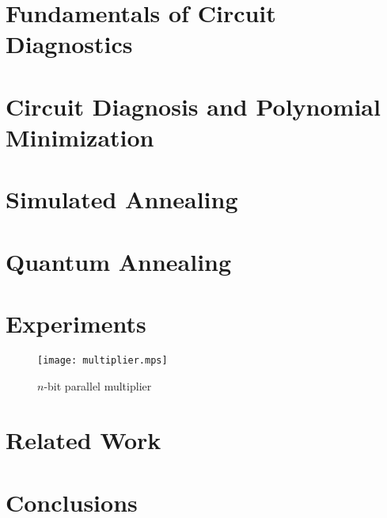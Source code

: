 \documentclass{article}
\begin{document}
\section{Fundamentals of Circuit Diagnostics}
\section{Circuit Diagnosis and Polynomial Minimization}
\section{Simulated Annealing}
\section{Quantum Annealing}
\section{Experiments}
%
\begin{figure}[htb]
\centering
\texttt{[image: multiplier.mps]}
\caption{$n$-bit parallel multiplier\label{fig:multiplier}}
\end{figure}
%
\section{Related Work}
\section{Conclusions}
\end{document}
